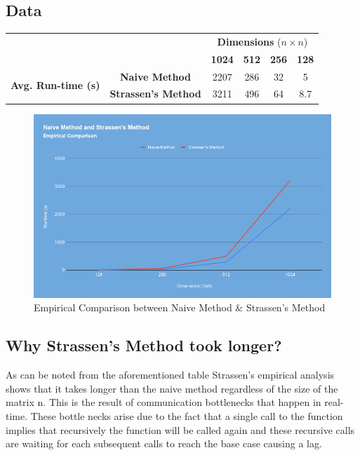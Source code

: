 \documentclass{article}
\begin{document}
\subsection{Data}
\begin{tabular}{|c|c|c|c|c|c|}
    \hline
     & & \multicolumn{4}{c|}{\textbf{Dimensions }($n \times n$)}\\
    \cline{3-6}
     & & \textbf{1024} & \textbf{512} & \textbf{256} & \textbf{128}  \\
     \hline
    \multirow{2}{*}{\textbf{Avg. Run-time (s)}} & \textbf{Naive Method} & 2207 & 286 & 32 & 5 \\
    \cline{2-6}
     & \textbf{Strassen's Method} & 3211 & 496 & 64 & 8.7 \\
    \hline
\end{tabular}

\begin{figure}[h!]
    \centering
    \includegraphics[scale=0.4]{chart.png}
    \caption{Empirical Comparison between Naive Method \& Strassen's Method}
\end{figure}


\subsection{Why Strassen's Method took longer?}
As can be noted from the aforementioned table Strassen's empirical analysis shows that it takes longer than the naive method regardless of the size of the matrix n. This is the result of communication bottlenecks that happen in real-time. These bottle necks arise due to the fact that a single call to the function implies that recursively the function will be called again and these recursive calls are waiting for each subsequent calls to reach the base case causing a lag.
\end{document}
